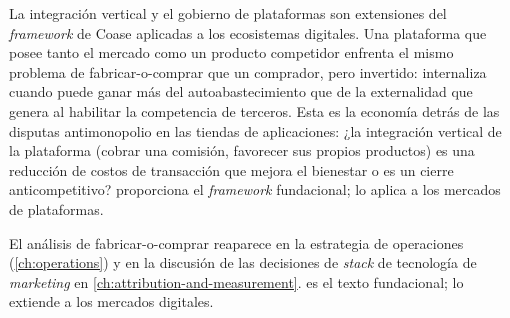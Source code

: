 La integración vertical y el gobierno de plataformas son extensiones del \emph{framework} de Coase
aplicadas a los ecosistemas digitales. Una plataforma que posee tanto el mercado como un producto
competidor enfrenta el mismo problema de fabricar-o-comprar que un comprador, pero invertido:
internaliza cuando puede ganar más del autoabastecimiento que de la externalidad que genera al
habilitar la competencia de terceros. Esta es la economía detrás de las disputas antimonopolio
en las tiendas de aplicaciones: ¿la integración vertical de la plataforma (cobrar una comisión,
favorecer sus propios productos) es una reducción de costos de transacción que mejora el bienestar
o es un cierre anticompetitivo? \textcite{coase1937nature} proporciona el \emph{framework}
fundacional; \textcite{dranove7theconomics} lo aplica a los mercados de plataformas.

El análisis de fabricar-o-comprar reaparece en la estrategia de operaciones (\cref{ch:operations})
y en la discusión de las decisiones de \emph{stack} de tecnología de \emph{marketing} en
\cref{ch:attribution-and-measurement}. \textcite{coase1937nature} es el texto fundacional;
\textcite{dranove7theconomics} lo extiende a los mercados digitales.

